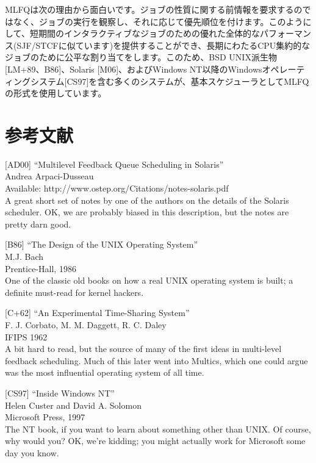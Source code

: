 MLFQは次の理由から面白いです。ジョブの性質に関する前情報を要求するのではなく、ジョブの実行を観察し、それに応じて優先順位を付けます。このようにして、短期間のインタラクティブなジョブのための優れた全体的なパフォーマンス(SJF/STCFに似ています)を提供することができ、長期にわたるCPU集約的なジョブのために公平な割り当てをします。このため、BSD
UNIX派生物{[}LM+89、B86{]}、Solaris {[}M06{]}、およびWindows
NT以降のWindowsオペレーティングシステム{[}CS97{]}を含む多くのシステムが、基本スケジューラとしてMLFQの形式を使用しています。

\hypertarget{ux53c2ux8003ux6587ux732e-3}{%
\section*{参考文献}\label{ux53c2ux8003ux6587ux732e-3}}

{[}AD00{]} ``Multilevel Feedback Queue Scheduling in Solaris''\\
Andrea Arpaci-Dusseau\\
Available: http://www.ostep.org/Citations/notes-solaris.pdf\\
A great short set of notes by one of the authors on the details of the
Solaris scheduler. OK, we are probably biased in this description, but
the notes are pretty darn good.

{[}B86{]} ``The Design of the UNIX Operating System''\\
M.J. Bach\\
Prentice-Hall, 1986\\
One of the classic old books on how a real UNIX operating system is
built; a definite must-read for kernel hackers.

{[}C+62{]} ``An Experimental Time-Sharing System''\\
F. J. Corbato, M. M. Daggett, R. C. Daley\\
IFIPS 1962\\
A bit hard to read, but the source of many of the first ideas in
multi-level feedback scheduling. Much of this later went into Multics,
which one could argue was the most influential operating system of all
time.

{[}CS97{]} ``Inside Windows NT''\\
Helen Custer and David A. Solomon\\
Microsoft Press, 1997\\
The NT book, if you want to learn about something other than UNIX. Of
course, why would you? OK, we're kidding; you might actually work for
Microsoft some day you know.

